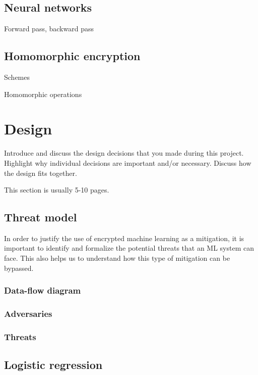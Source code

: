 \documentclass[a4paper,11pt,oneside]{report}
\begin{document}
\section{Neural networks}

Forward pass, backward pass

\section{Homomorphic encryption}

Schemes

Homomorphic operations


\chapter{Design}

Introduce and discuss the design decisions that you made during this project.
Highlight why individual decisions are important and/or necessary. Discuss
how the design fits together.

This section is usually 5-10 pages.

\section{Threat model}

In order to justify the use of encrypted machine learning as a mitigation, it is important to identify and formalize the potential threats that an ML system can face. This also helps us to understand how this type of mitigation can be bypassed.

\subsection{Data-flow diagram}

\subsection{Adversaries}

\subsection{Threats}

\section{Logistic regression}
\end{document}

